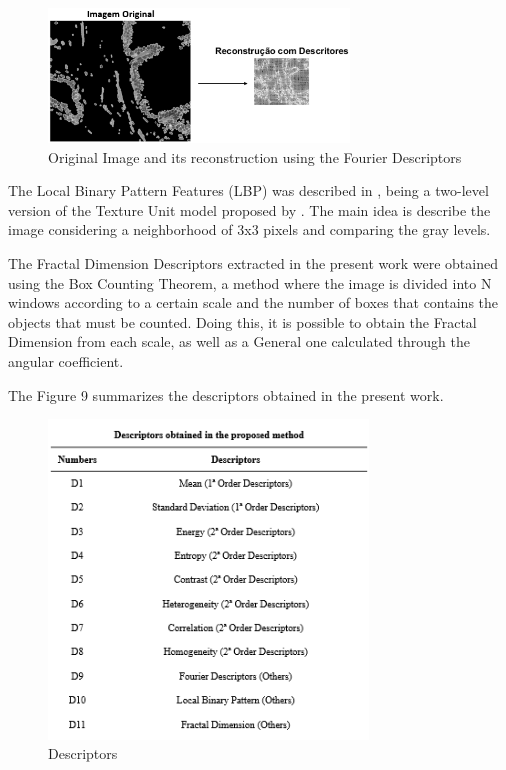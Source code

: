\documentclass[conference]{IEEEtran}
\begin{document}
\begin{figure}[h]
    \centering
    \includegraphics[width=8cm]{images/imagem_reconstrucao.png}
    \caption{Original Image and its reconstruction using the Fourier Descriptors}
    \label{fig:my_label}
\end{figure}{}
The Local Binary Pattern Features (LBP) was described in \cite{lbp-OjalaPH96}, being a two-level version of the Texture Unit model proposed by \cite{Wang:1990:TCU:83597.83606}. The main idea is describe the image considering a neighborhood of 3x3 pixels and comparing the gray levels.\par
The Fractal Dimension Descriptors extracted in the present work were obtained using the Box Counting Theorem, a method where the image is divided into N windows according to a certain scale and the number of boxes that contains the objects that must be counted. Doing this, it is possible to obtain the Fractal Dimension from each scale, as well as a General one calculated through the angular coefficient.\par
The Figure 9 summarizes the descriptors obtained in the present work. 
\begin{figure}[h]
    \centering
    \includegraphics[width=8.5cm]{images/table_descriptors.png}
    \caption{Descriptors}
    \label{fig:my_label}
\end{figure}{}
\end{document}
